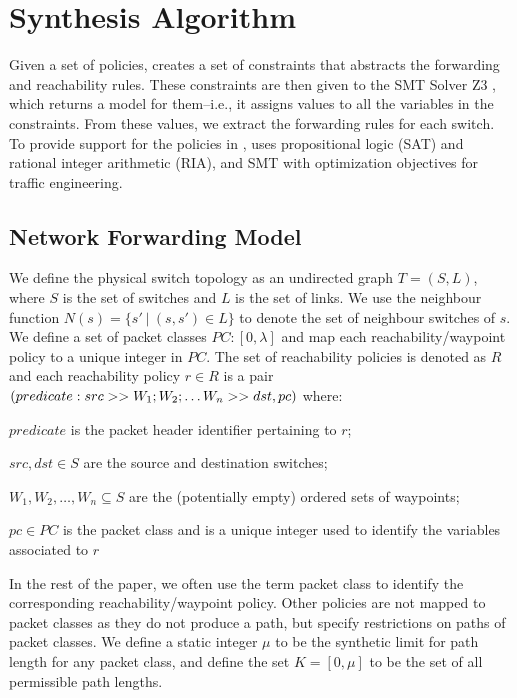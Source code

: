 \section{Synthesis Algorithm}
Given a set of policies, \Name creates a set of constraints 
that abstracts the forwarding and reachability rules. 
These constraints are then given to the SMT Solver Z3 \cite{z3}, which returns a model 
for them--i.e., it assigns values to all the variables in the constraints. From these values, we extract the forwarding rules for each switch.
To provide support for the policies in , \name uses propositional logic (SAT) and rational integer arithmetic (RIA),
and SMT with optimization objectives for traffic engineering.
\subsection{Network Forwarding Model} \label{sec:fwdmodel}
We define the physical switch topology as an undirected graph $T=(S, L)$,
where $S$ is the set of switches and $L$ is the set of links. 
We use the neighbour function $N(s) = \{s'\ | \ (s,s') \in L \}$ to denote 
the set of neighbour switches of $s$. 
We define a set of packet classes $PC : [0,\lambda]$ and map each reachability/waypoint policy to a unique integer in $PC$.
The set of reachability policies is denoted as $R$ and each reachability policy $r \in R$ is
a pair
$(predicate :\newline src >> W_1;W_2; \ldots W_n >> dst, pc)$
where:
\begin{compactitemize}
\item  $predicate$ is the packet header identifier pertaining to $r$;
\item  $src,dst \in S$ are the source and destination switches;
\item $W_1, W_2, \ldots, W_n \subseteq S$ are the (potentially empty) ordered sets of waypoints; 
\item $pc \in PC$ is the packet class and is a unique integer used to identify the variables associated to $r$
\end{compactitemize} 
In the rest of the paper, we often use the term packet class to identify the corresponding reachability/waypoint policy. 
Other policies are not mapped to packet classes as they do not produce a path, but specify restrictions on paths of packet classes. 
We define a static integer $\mu$ to be the synthetic limit for path length for any packet class, and define the set $K = [0, \mu]$ to be the set of all permissible path lengths.

